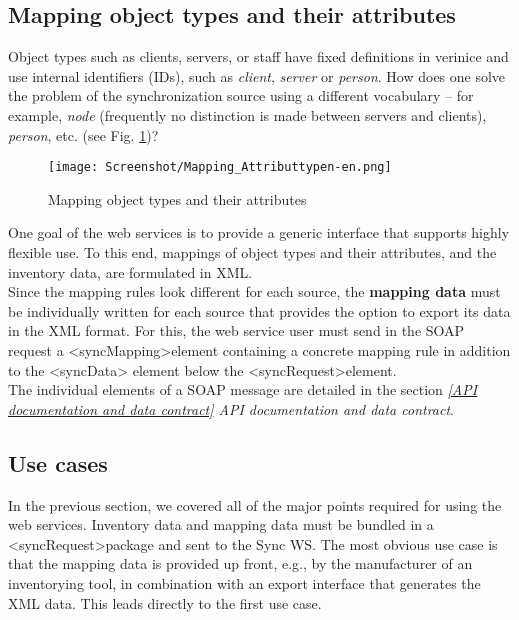 \documentclass[a4paper,10pt]{book}
\begin{document}
\subsection{Mapping object types and their attributes}
Object types such as clients, servers, or staff have fixed definitions in verinice and use internal identifiers (IDs), such
as {\em client}, {\em server} or {\em person}. How does one solve the problem of the synchronization source using a different vocabulary –
for example, {\em node} (frequently no distinction is made between servers and clients), {\em person}, etc. (see Fig. \ref{Mapping object types and their attributes})?
\newline
\begin{figure}[htb!]
  \centering
  \texttt{[image: Screenshot/Mapping\_Attributtypen-en.png]}
  \caption{\label{Mapping object types and their attributes} Mapping object types and their attributes}
\end{figure}
\newline
One goal of the web services is to provide a generic interface that supports highly flexible use. To this end, mappings of object types and their
attributes, and the inventory data, are formulated in XML.
\newline\\
Since the mapping rules look different for each source, the \textbf{mapping data} must be individually written for each source that provides the
option to export its data in the XML format. For this, the web service user must send in the SOAP request a
\textless syncMapping\textgreater element containing a concrete mapping rule in addition to the \textless syncData\textgreater
element below the \textless syncRequest\textgreater element.
\newline\\
The individual elements of a SOAP message are detailed in the section {\em\ref{API documentation and data contract} API documentation and data contract}.

\subsection{Use cases}
In the previous section, we covered all of the major points required for using the web services. Inventory data and
mapping data must be bundled in a \textless syncRequest\textgreater package and sent to the Sync WS.
The most obvious use case is that the mapping data is provided up front, e.g., by the manufacturer of an
inventorying tool, in combination with an export interface that generates the XML data. This leads directly
to the first use case.
\newline\\
\end{document}
